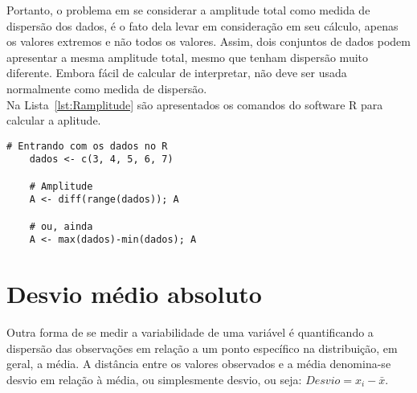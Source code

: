\documentclass[11pt,fleqn]{book} %
\begin{document}
Portanto, o problema em se considerar a amplitude total como medida de dispersão dos dados, é o fato dela levar em consideração em seu cálculo, apenas os valores extremos e não todos os valores. Assim, dois conjuntos de dados podem apresentar a mesma amplitude total, mesmo que tenham dispersão muito diferente. Embora fácil de calcular de interpretar, não deve ser usada normalmente como medida de dispersão. \\

Na Lista~\ref{lst:Ramplitude} são apresentados os comandos do software R para calcular a aplitude. \\

\begin{scriptsize}
	\estiloR
	\begin{lstlisting}[caption={Comandos do software R}, label=lst:Ramplitude]
	# Entrando com os dados no R
	dados <- c(3, 4, 5, 6, 7)
	
	# Amplitude
	A <- diff(range(dados)); A
	
	# ou, ainda
	A <- max(dados)-min(dados); A

	\end{lstlisting}
\end{scriptsize}




\section{Desvio médio absoluto}

Outra forma de se medir a variabilidade de uma variável é quantificando a dispersão das observações em relação a um ponto específico na distribuição, em geral, a média. A distância entre os valores observados e a média denomina-se desvio em relação à média, ou simplesmente desvio, ou seja: $Desvio=x_i-\bar{x}$. \\
\end{document}
